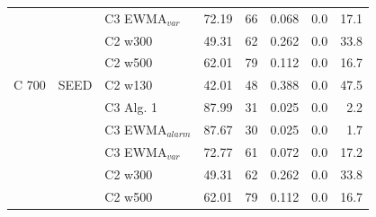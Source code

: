 \begin{longtable}{lllrrrrr}
 &  & C3 EWMA$_{var}$ & 72.19 & 66 & 0.068 & 0.0 & 17.1 \\
 &  & C2 w300 & 49.31 & 62 & 0.262 & 0.0 & 33.8 \\
 &  & C2 w500 & 62.01 & 79 & 0.112 & 0.0 & 16.7 \\
\hline
C  700 & SEED & C2 w130 & 42.01 & 48 & 0.388 & 0.0 & 47.5 \\
 &  & C3 Alg. 1 & 87.99 & 31 & 0.025 & 0.0 & 2.2 \\
 &  & C3 EWMA$_{alarm}$ & 87.67 & 30 & 0.025 & 0.0 & 1.7 \\
 &  & C3 EWMA$_{var}$ & 72.77 & 61 & 0.072 & 0.0 & 17.2 \\
 &  & C2 w300 & 49.31 & 62 & 0.262 & 0.0 & 33.8 \\
 &  & C2 w500 & 62.01 & 79 & 0.112 & 0.0 & 16.7 \\
\hline
\end{longtable}

